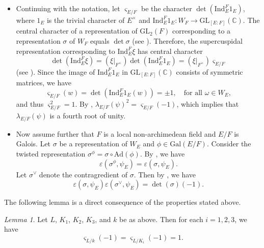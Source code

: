 \documentclass[12pt]{amsart}
\newcommand{\Ad}{{\mathrm{Ad}}}
\newcommand{\Gal}{{\mathrm{Gal}}}
\newcommand{\GL}{{\mathrm{GL}}}
\theoremstyle{Theorem}
\theoremstyle{Theorem}
\theoremstyle{Theorem}
\theoremstyle{Theorem}
\theoremstyle{Plain}
\theoremstyle{remark}
\theoremstyle{remark}
\theoremstyle{Definition}
\newtheorem{lemd}[dfn]{Lemma}
\begin{document}
\begin{itemize}
\[    \]
    (see \cite[Corollary 30.4, 34.3]{B-H}).
    \item Continuing with the notation, let $ \varsigma_{ E/F } $ be the character $ \det \left( \mathrm{Ind}^F_E 1_E \right) $, where $1_E$ is the trivial character of $E^\times$ and $ \mathrm{Ind}^F_E 1_E: W_F \rightarrow \GL_{ [E:F] } ( \mathbb{C} ) $. The central character of a representation of $\GL_2(F)$ corresponding to a representation $\sigma$ of $W_F$ equals $ \det \sigma $ (see \cite[Proposition 33.4]{B-H}). Therefore, the supercuspidal representation corresponding to $ \mathrm{Ind}^F_E \xi $ has central character
    \[
        \det \left( \mathrm{Ind}^F_E \xi \right) = \left( \xi|_{ F^\times } \right) \det \left( \mathrm{Ind}^F_E 1_E \right) = \left( \xi|_{ F^\times } \right) \varsigma_{ E/F }
    \]
    (see \cite[34.2]{B-H}). Since the image of $ \mathrm{Ind}^F_E 1_E $ in $ \GL_{ [E:F] } ( \mathbb{C} ) $ consists of symmetric matrices, we have 
    \[
        \varsigma_{ E/F }(w) = \det ( \mathrm{Ind}^F_E 1_E (w) ) = \pm1, \quad \text{for all } \omega \in W_E,
    \]
    and thus $ \varsigma_{ E/F }^2 = 1 $. By \cite[30.4.3]{B-H}, $ \lambda_{ E/F }( \psi )^2 = \varsigma_{ E/F } (-1) $, which implies that $ \lambda_{ E/F } ( \psi ) $ is a fourth root of unity.
    \item Now assume further that $F$ is a local non-archimedean field and $E/F$ is Galois. Let $\sigma$ be a representation of $W_E$ and $ \phi \in \Gal( E/F ) $. Consider the twisted representation $ \sigma^\phi = \sigma \circ \Ad( \phi )$. By \cite[1.17]{Tunnell}, we have
    \begin{equation}
        \label{twistepsilon}
        \varepsilon \left( \sigma^\phi, \psi_E \right) = \varepsilon \left( \sigma, \psi_E \right).
    \end{equation}
    Let $ \sigma^\vee $ denote the contragredient of $\sigma$. Then by \cite[1.1.6]{Tunnell}, we have
    \begin{equation}
        \label{contraepsilon}
        \varepsilon( \sigma, \psi_E ) \varepsilon \left( \sigma^\vee, \psi_E \right) = \det ( \sigma ) (-1).
    \end{equation}
\end{itemize}
The following lemma is a direct consequence of the properties stated above.

\begin{lemd}
    \label{varsigma-11}
    Let $L$, $K_1$, $K_2$, $K_3$, and $k$ be as above. Then for each $ i = 1, 2, 3 $, we have
    \[
        \varsigma_{ L/k } (-1) = \varsigma_{ L/K_i } (-1) = 1.
    \]
\end{lemd}
\end{document}
